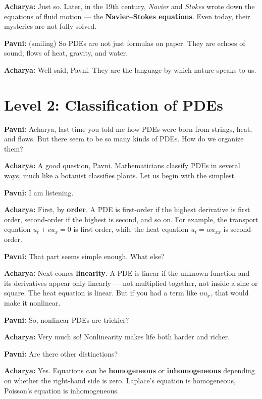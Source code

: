 \documentclass[
  letterpaper,
]{book}
\begin{document}
\textbf{Acharya:} Just so. Later, in the 19th century, \emph{Navier} and
\emph{Stokes} wrote down the equations of fluid motion --- the
\textbf{Navier--Stokes equations}. Even today, their mysteries are not
fully solved.

\textbf{Pavni:} (smiling) So PDEs are not just formulas on paper. They
are echoes of sound, flows of heat, gravity, and water.

\textbf{Acharya:} Well said, Pavni. They are the language by which
nature speaks to us.


\chapter{Level 2: Classification of
PDEs}\label{level-2-classification-of-pdes}

\textbf{Pavni:} Acharya, last time you told me how PDEs were born from
strings, heat, and flows. But there seem to be so many kinds of PDEs.
How do we organize them?

\textbf{Acharya:} A good question, Pavni. Mathematicians classify PDEs
in several ways, much like a botanist classifies plants. Let us begin
with the simplest.

\textbf{Pavni:} I am listening.

\textbf{Acharya:} First, by \textbf{order}. A PDE is first-order if the
highest derivative is first order, second-order if the highest is
second, and so on. For example, the transport equation
\(u_t + c u_x = 0\) is first-order, while the heat equation
\(u_t = \alpha u_{xx}\) is second-order.

\textbf{Pavni:} That part seems simple enough. What else?

\textbf{Acharya:} Next comes \textbf{linearity}. A PDE is linear if the
unknown function and its derivatives appear only linearly --- not
multiplied together, not inside a sine or square. The heat equation is
linear. But if you had a term like \(u u_x\), that would make it
nonlinear.

\textbf{Pavni:} So, nonlinear PDEs are trickier?

\textbf{Acharya:} Very much so! Nonlinearity makes life both harder and
richer.

\textbf{Pavni:} Are there other distinctions?

\textbf{Acharya:} Yes. Equations can be \textbf{homogeneous} or
\textbf{inhomogeneous} depending on whether the right-hand side is zero.
Laplace's equation is homogeneous, Poisson's equation is inhomogeneous.
\end{document}
